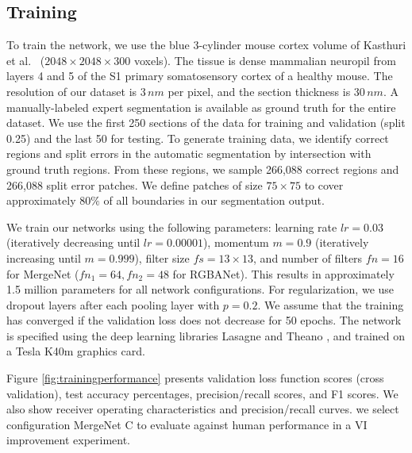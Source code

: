 \subsection{Training}
To train the network, we use the blue 3-cylinder mouse cortex volume of Kasthuri et al.\ \cite{kasthuri2015saturated} ($2048\times2048\times300$ voxels). The tissue is dense mammalian neuropil from layers 4 and 5 of the S1 primary somatosensory cortex of a healthy mouse. The resolution of our dataset is $3\, nm$ per pixel, and the section thickness is $30\, nm$. 
A manually-labeled expert segmentation is available as ground truth for the entire dataset. We use the first 250 sections of the data for training and validation (split 0.25) and the last 50 for testing. To generate training data, we identify correct regions and split errors in the automatic segmentation by intersection with ground truth regions. From these regions, we sample 266,088 correct regions and 266,088 split error patches. We define patches of size $75\times75$ to cover approximately $80\%$ of all boundaries in our segmentation output. 
%



We train our networks using the following parameters: learning rate $lr=0.03$ (iteratively decreasing until $lr=0.00001$), momentum $m=0.9$ (iteratively increasing until $m=0.999$), filter size $fs=13\times13$, and number of filters $fn=16$ for MergeNet ($fn_1=64, fn_2=48$ for RGBANet). This results in approximately 1.5 million parameters for all network configurations. For regularization, we use dropout layers after each pooling layer with $p=0.2$. We assume that the training has converged if the validation loss does not decrease for 50 epochs. The network is specified using the deep learning libraries Lasagne and Theano \cite{Bastien-Theano-2012}, and trained on a Tesla K40m graphics card.

Figure \ref{fig:trainingperformance} presents validation loss function scores (cross validation), test accuracy percentages, precision/recall scores, and F1 scores. We also show receiver operating characteristics and precision/recall curves.  we select configuration MergeNet C to evaluate against human performance in a VI improvement experiment. 







